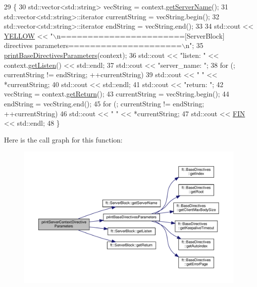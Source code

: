 \begin{DoxyCode}
29     \{
30         std::vector<std::string>        vecString = context.\hyperlink{classft_1_1_server_block_aa14d06f644ee8148fa9e2ee53d9625f9}{getServerName}();
31         std::vector<std::string>::iterator  currentString = vecString.begin();
32         std::vector<std::string>::iterator      endString = vecString.end();
33 
34         std::cout << \hyperlink{_print_config_8hpp_abf681265909adf3d3e8116c93c0ba179}{YELLOW} << \textcolor{stringliteral}{"\(\backslash\)n=======================[ServerBlock] directives
       parameters=====================\(\backslash\)n"};
35         \hyperlink{classft_1_1_print_config_ad71821d54e46c04a81d26dbabd3c4b20}{printBaseDirectivesParameters}(context);
36         std::cout << \textcolor{stringliteral}{"listen: "} << context.\hyperlink{classft_1_1_server_block_a2e03d2c2635620f103971ff8031779a7}{getListen}() << std::endl;
37         std::cout << \textcolor{stringliteral}{"server\_name: "};
38         \textcolor{keywordflow}{for} (; currentString != endString; ++currentString)
39             std::cout << \textcolor{stringliteral}{" "} << *currentString;
40         std::cout << std::endl;
41         std::cout << \textcolor{stringliteral}{"return: "};
42         vecString = context.\hyperlink{classft_1_1_server_block_aeef5e4710c02406c46e54d4aa0c8f57c}{getReturn}();
43         currentString = vecString.begin();
44         endString = vecString.end();
45         \textcolor{keywordflow}{for} (; currentString != endString; ++currentString)
46             std::cout << \textcolor{stringliteral}{" "} << *currentString;
47         std::cout << \hyperlink{_print_config_8hpp_a1ce3da0d4a8e4638874faeae3b66fbcc}{FIN} << std::endl;
48     \}
\end{DoxyCode}
Here is the call graph for this function\+:
\nopagebreak
\begin{figure}[H]
\begin{center}
\leavevmode
\includegraphics[width=350pt]{classft_1_1_print_config_a5f88f0aae9e0678e2637ae329b74739e_cgraph}
\end{center}
\end{figure}
